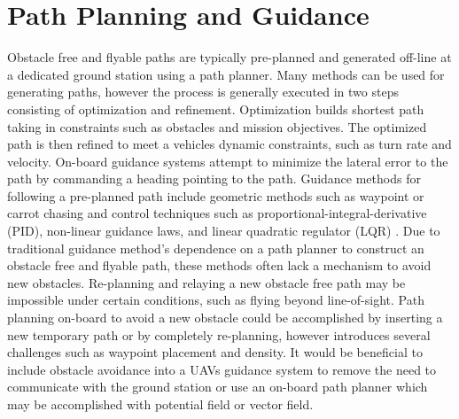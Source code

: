 \documentclass[numbered,pdftex]{ohio-etd}
\begin{document}
\section{Path Planning and Guidance}
Obstacle free and flyable paths are typically pre-planned and generated off-line at a dedicated ground station using a path planner. Many methods can be used for generating paths, however the process is generally executed in two steps consisting of optimization and refinement. Optimization builds shortest path taking in constraints such as obstacles and mission objectives. The optimized path is then refined to meet a vehicles dynamic constraints, such as turn rate and velocity. On-board guidance systems attempt to minimize the lateral error to the path by commanding a heading pointing to the path. Guidance methods for following a pre-planned path include geometric methods such as waypoint or carrot chasing and control techniques such as proportional-integral-derivative (PID), non-linear guidance laws, and linear quadratic regulator (LQR) \cite{sujit_unmanned_2014}. Due to traditional guidance method's dependence on a path planner to construct an obstacle free and flyable path, these methods often lack a mechanism to avoid new obstacles. Re-planning and relaying a new obstacle free path may be impossible under certain conditions, such as flying beyond line-of-sight. Path planning on-board to avoid a new obstacle could be accomplished by inserting a new temporary path or by completely re-planning, however introduces several challenges such as waypoint placement and density. It would be beneficial to include obstacle avoidance into a UAVs guidance system to remove the need to communicate with the ground station or use an on-board path planner which may be accomplished with potential field or vector field. \\
\end{document}
